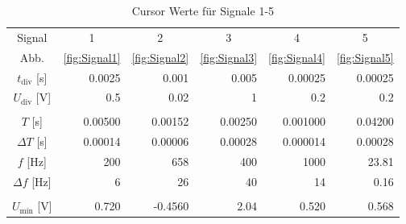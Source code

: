 \setcellgapes{3pt}
\begin{table}[htbp]
    \centering\makegapedcells
    \caption{Cursor Werte für Signale 1-5}
\begin{tabular}{crrrrr}
\hline
\multicolumn{1}{|c}{Signal}         & \multicolumn{1}{c}{1} & \multicolumn{1}{c}{2} & \multicolumn{1}{c}{3} & \multicolumn{1}{c}{4}  & \multicolumn{1}{c|}{5}      \\
\multicolumn{1}{|c}{Abb.}           & \multicolumn{1}{c}{\cref{fig:Signal1}}  & \multicolumn{1}{c}{\cref{fig:Signal2}}  & \multicolumn{1}{c}{\cref{fig:Signal3}}  & \multicolumn{1}{c}{\cref{fig:Signal4}}  &\multicolumn{1}{c|}{\cref{fig:Signal5}}       \\ \hline\hline
\multicolumn{1}{|c|}{\(t_\text{div}\) [\unit{\s}]}          & 0.0025                & 0.001                 & 0.005                 & 0.00025 & \multicolumn{1}{r|}{0.00025}  \\ \hline
\multicolumn{1}{|c|}{\(U_\text{div}\) [\unit{\volt}]}          & 0.5                   & 0.02                  & 1                     & 0.2 &\multicolumn{1}{r|}{0.2}      \\ \hline
                                    &                       &                       &                       &                               \\ \hline
\multicolumn{1}{|c|}{\(T\) [\unit{\s}]}             & 0.00500               & 0.00152               & 0.00250               & 0.001000 & \multicolumn{1}{r|}{0.04200} \\ \hline
\multicolumn{1}{|c|}{\(\Delta T\) [\unit{\s}]}       & 0.00014               & 0.00006               & 0.00028               & 0.000014 & \multicolumn{1}{r|}{0.00028} \\ \hline
\multicolumn{1}{|c|}{\(f\) [\unit{\hertz}]}             & 200                   & 658                   & 400                   & 1000 & \multicolumn{1}{r|}{23.81}     \\ \hline
\multicolumn{1}{|c|}{\(\Delta f\) [\unit{\hertz}]}       & 6                     & 26                    & 40                    & 14 & \multicolumn{1}{r|}{0.16}       \\ \hline
                                    &                       &                       &                       &                               \\ \hline
\multicolumn{1}{|c|}{\(U_\text{min}\) [\unit{\volt}]}        & 0.720                 & -0.4560               & 2.04                  & 0.520 & \multicolumn{1}{r|}{0.568}    \\ \hline

\end{tabular}
\end{table}
